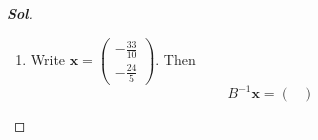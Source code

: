 \begin{enumerate}
\begin{proof}[\normalfont\color{magenta}\bfseries Sol]
\begin{enumerate}
\[\begin{pmatrix}
			\frac{17}{5}
		\end{pmatrix}.
		\]
		Hence
		\[
		\mathbf z=\left\lfloor B^{-1}\mathbf x\right\rfloor
		=
		\begin{pmatrix}
			-3\\
			3
		\end{pmatrix},
		\qquad
		\boldsymbol\alpha
		=
		\begin{pmatrix}
			\frac1{10}\\[2pt]
			\frac25
		\end{pmatrix}.
		\]
		Therefore
		\[
		\mathbf y=B\mathbf z
		=
		\begin{pmatrix}
			1&2\\
			2&1
		\end{pmatrix}
		\begin{pmatrix}
			-3\\
			3
		\end{pmatrix}
		=
		\begin{pmatrix}
			3\\
			-3
		\end{pmatrix},\quad\text{and}\quad
		\mathbf p=B\boldsymbol\alpha
		=
		\begin{pmatrix}
			1&2\\
			2&1
		\end{pmatrix}
		\begin{pmatrix}
			\frac1{10}\\[2pt]
			\frac25
		\end{pmatrix}
		=
		\begin{pmatrix}
			\frac9{10}\\[2pt]
			\frac35
		\end{pmatrix}.
		\]
		So
		\[
		\boxed{
			\begin{pmatrix}
				3.9\\
				-2.4
			\end{pmatrix}
			=
			\begin{pmatrix}
				3\\
				-3
			\end{pmatrix}
			+
			\begin{pmatrix}
				\frac9{10}\\[2pt]
				\frac35
			\end{pmatrix}.
		}
		\]
		\item Write $\mathbf x=
		\begin{pmatrix}
			-\frac{33}{10}\\[2pt]
			-\frac{24}{5}
		\end{pmatrix}$.
		Then
		\[
		B^{-1}\mathbf x
		=
		\begin{pmatrix}

\end{pmatrix}\]
\end{enumerate}
\end{proof}
\end{enumerate}
